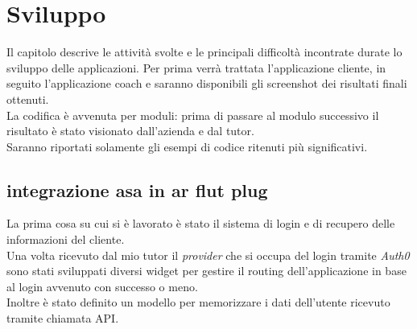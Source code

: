 
\chapter{Sviluppo}
\label{cap:sviluppo}
Il capitolo descrive le attività svolte e le principali difficoltà incontrate durate lo sviluppo delle applicazioni. Per prima verrà trattata l'applicazione cliente, in seguito l'applicazione coach e saranno disponibili gli screenshot dei risultati finali ottenuti.\\
La codifica è avvenuta per moduli: prima di passare al modulo successivo il risultato è stato visionato dall’azienda e dal tutor.\\
Saranno riportati solamente gli esempi di codice ritenuti più significativi.

\section{integrazione asa in ar flut plug}
La prima cosa su cui si è lavorato è stato il sistema di login e di recupero delle informazioni del cliente.\\
Una volta ricevuto dal mio tutor il \textit{provider} che si occupa del login tramite \textit{Auth0} sono stati sviluppati diversi widget per gestire il routing dell'applicazione in base al login avvenuto con successo o meno.\\
Inoltre è stato definito un modello per memorizzare i dati dell'utente ricevuto tramite chiamata API.
